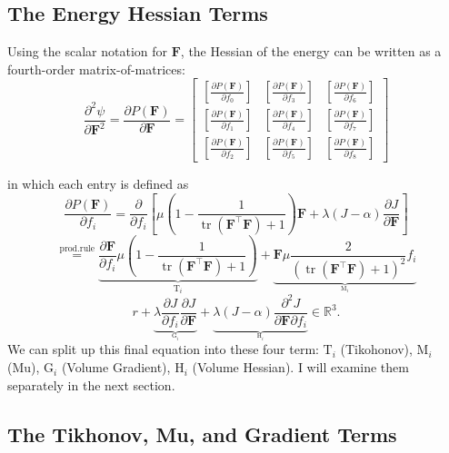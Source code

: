 
\subsection{The Energy Hessian Terms}
Using the scalar notation for $\mathbf{F}$, the Hessian of the energy can be written as a fourth-order matrix-of-matrices:
\[
\frac{\partial^2 \psi}{\partial \mathbf{F}^2} = \frac{\partial P(\mathbf{F})}{\partial \mathbf{F}} = 
\left[\begin{array}{ccc}{\left[\frac{\partial P(\mathbf{F})}{\partial f_0}\right]} & {\left[\frac{\partial P(\mathbf{F})}{\partial f_3}\right]} & {\left[\frac{\partial P(\mathbf{F})}{\partial f_6}\right]} \\ {\left[\frac{\partial P(\mathbf{F})}{\partial f_1}\right]} & {\left[\frac{\partial P(\mathbf{F})}{\partial f_4}\right]} & {\left[\frac{\partial P(\mathbf{F})}{\partial f_7}\right]} \\ {\left[\frac{\partial P(\mathbf{F})}{\partial f_2}\right]} & {\left[\frac{\partial P(\mathbf{F})}{\partial f_5}\right]} & {\left[\frac{\partial P(\mathbf{F})}{\partial f_8}\right]} \end{array}\right]
\]

in which each entry is defined as
\[
\frac{\partial P(\mathbf{F})}{\partial f_i} = \frac{\partial}{\partial f_i} \left[ \mu \left( 1 - \frac{1}{\operatorname{tr}(\mathbf{F}^\intercal \mathbf{F}) + 1}\right) \mathbf{F} + \lambda(J-\alpha)\frac{\partial J}{\partial \mathbf{F}} \right]
\]
\[
\stackrel{\text{prod.rule}}{=} \underbrace{\frac{\partial \mathbf{F}}{\partial f_i} \mu \left( 1 - \frac{1}{\operatorname{tr}(\mathbf{F}^\intercal \mathbf{F}) + 1}\right)}_{\mathrm{T}_{i}}  + \underbrace{\mathbf{F} \mu \frac{2}{\left(\operatorname{tr}(\mathbf{F^\intercal}\mathbf{F}) + 1\right)^2} f_i}_{_{\mathrm{M}_{i}}}
\]
\[
r+ \underbrace{\lambda \frac{\partial J}{\partial f_i} \frac{\partial J}{\partial \mathbf{F}}}_{_{\mathrm{G}_{i}}}+ \underbrace{\lambda (J- \alpha) \frac{\partial^2 J}{\partial \mathbf{F}\partial f_i}}_{_{\mathrm{H}_{i}}} \in \mathbb{R}^{3}.
\]
We can split up this final equation into these four term: $\mathrm{T}_i$ (Tikohonov), $\mathrm{M}_i$ (Mu), $\mathrm{G}_i$ (Volume Gradient), $\mathrm{H}_i$ (Volume Hessian). I will examine them separately in the next section.

\subsection{The Tikhonov, Mu, and Gradient Terms}
